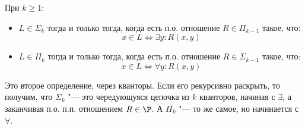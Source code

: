 	\begin{theorem}
		При $k \ge 1$:
		\begin{itemize}
			\item
				$L \in \Sigma_k$ тогда и только тогда, когда есть п.о. отношение $R \in \Pi_{k-1}$ такое, что:
				\[ x \in L \iff \exists y \colon R(x, y) \]
			\item
				$L \in \Pi_k$ тогда и только тогда, когда есть п.о. отношение $R \in \Sigma_{k-1}$ такое, что:
				\[ x \in L \iff \forall y \colon R(x, y) \]
		\end{itemize}
	\end{theorem}
	\begin{Rem}
		Это второе определение, через кванторы.
		Если его рекурсивно раскрыть, то получим, что $\Sigma_k$ "--- это чередующуяся цепочка из $k$ кванторов, начиная с $\exists$, а заканчивая п.о. п.п. отношением $R \in \P$.
		А $\Pi_k$ "--- то же самое, но начинается с $\forall$.
	\end{Rem}
